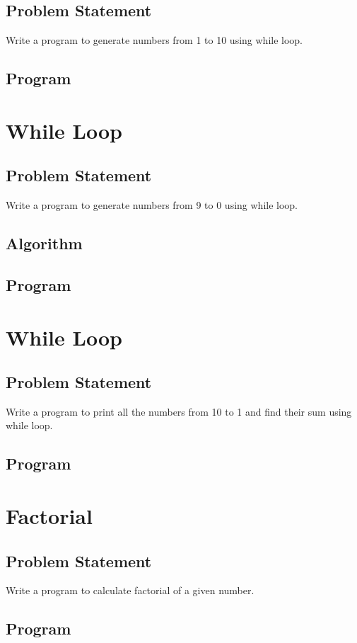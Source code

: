 \documentclass[11pt]{report}
\begin{document}
\section{Problem Statement}
Write a program to generate numbers from 1 to 10 using while loop.
\section{Program}
		

\chapter{While Loop}
\section{Problem Statement}
Write a program to generate numbers from 9 to 0 using while loop.
\section{Algorithm}
\section{Program}


\chapter{While Loop}
\section{Problem Statement}
Write a program to print all the numbers from 10 to 1 and find their sum using while loop.
\section{Program}


\chapter{Factorial}
\section{Problem Statement}
Write a program to calculate factorial of a given number.
\section{Program}

		
\end{document}
